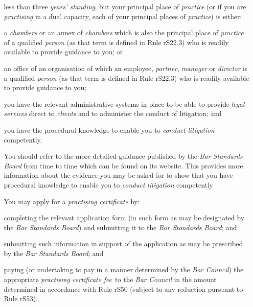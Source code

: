 \item less than three \emph{years' standing}, but your principal place of
\emph{practice} (or if you are \emph{practising} in a dual capacity,
each of your principal places of \emph{practice}) is either:
\rl
\item a \emph{chambers} or an annex of \emph{chambers} which is also the
principal place of \emph{practice} of a qualified \emph{person} (as that
term is defined in Rule rS22.3) who is readily available to provide
guidance to you; or

\item an office of an organisation of which an employee, \emph{partner},
\emph{manager} or \emph{director} is a qualified \emph{person} (as that
term is defined in Rule rS22.3) who is readily available to provide
guidance to you;
\lr\la
\item you have the relevant administrative systems in place to be able to
provide \emph{legal services} direct to \emph{clients} and to administer
the conduct of litigation; and
\item you have the procedural knowledge to enable you to \emph{conduct
litigation} competently.

\ln
{}



You should refer to the more detailed guidance published by the
\emph{Bar Standards Board} from time to time which can be found on its
website. This provides more information about the evidence you may be
asked for to show that you have procedural knowledge to enable you to
\emph{conduct litigation} competently




You may apply for a \emph{practising certificate} by:\nl\item completing the relevant application form (in such form as may be
designated by the \emph{Bar Standards Board}) and submitting it to the
\emph{Bar Standards Board}; and
\item submitting such information in support of the application as may be
prescribed by the \emph{Bar Standards Board}; and
\item paying (or undertaking to pay in a manner determined by the \emph{Bar
Council}) the appropriate \emph{practising certificate fee}~to the
\emph{Bar Council} in the amount determined in accordance with Rule rS50
(subject to any reduction pursuant to Rule rS53).\ln

